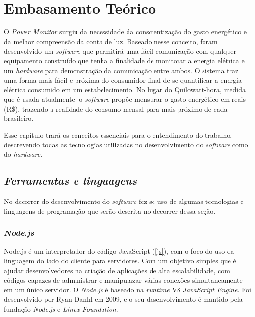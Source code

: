 \chapter[Embasamento Teórico]{Embasamento Teórico}
\label{ch:cap2}
O \textit{Power Monitor} surgiu da necessidade da conscientização do gasto energético e da melhor compreensão da conta de luz. Baseado nesse conceito,
foram desenvolvido um \textit{software} que permitirá uma fácil comunicação com qualquer equipamento construído que tenha a finalidade de monitorar a energia elétrica e um \textit{hardware} para demonstração
da comunicação entre ambos.
O sistema traz uma forma mais fácil e próxima do consumidor final de se quantificar a energia elétrica consumido em um estabelecimento. No lugar do Quilowatt-hora, medida que é usada atualmente,
o \textit{software} propõe mensurar o gasto energético em reais (R\$), trazendo a realidade do consumo mensal para mais próximo de cada brasileiro.

Esse capítulo trará os conceitos essenciais para o entendimento do trabalho, descrevendo todas as tecnologias utilizadas no desenvolvimento 
do \textit{software} como do \textit{hardware}.

\section[\textit{Ferramentas e linguagens}]{\textit{Ferramentas e linguagens}}\label{ferramenta-linguagem}
No decorrer do desenvolvimento do \textit{software} fez-se uso de algumas tecnologias e linguagens de programação que serão descrita no decorrer
dessa seção.
\subsection[\textit{Node.js}]{\textit{Node.js}}\label{node}
Node.js é um interpretador do código JavaScript (\autoref{js}), com o foco do uso da linguagem do lado do cliente para servidores. Com um objetivo simples
que é ajudar desenvolvedores na criação de aplicações de alta escalabilidade, com códigos capazes de administrar e manipulazar várias conexões simultaneamente
em um único servidor. O \textit{Node.js} é baseado na \textit{runtime} V8 \textit{JavaScript Engine}. Foi desenvolvido por Ryan Danhl em 2009, e o seu desenvolvimento
é mantido pela fundação \textit{Node.js} e \textit{Linux Foundation}. 
